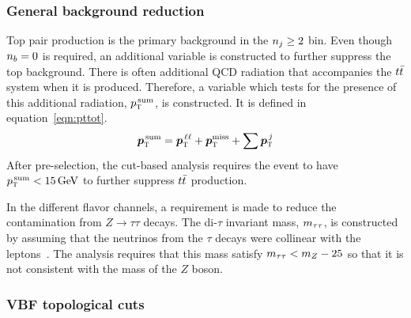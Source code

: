 \subsubsection{General background reduction}

Top pair production is the primary background in the $n_j \geq 2$ bin. Even though $n_b = 0$ is required, an additional variable is constructed to further suppress the top background. There is often additional QCD radiation that accompanies the $t\bar{t}$ system when it is produced. Therefore, a variable which tests for the presence of this additional radiation, $p_{\textrm{\footnotesize\sc t}}^{\,\rm sum}$, is constructed. It is defined in equation~\ref{eqn:pttot}.
%
\begin{equation}
\hbox{\bm{$p$}}_{\textrm{\footnotesize\sc t}}^{\,\rm sum} = \hbox{\bm{$p$}}_{\textrm{\footnotesize\sc t}}^{\,\ell\ell} + \hbox{\bm{$p$}}_{\textrm{\footnotesize\sc t}}^{\rm miss} + \sum \hbox{\bm{$p$}}_{\textrm{\footnotesize\sc t}}^{\,j}
\label{eqn:pttot}
\end{equation} 
%
After pre-selection, the cut-based analysis requires the event to have $\pTtot < 15 \GeV$ to further suppress $t\bar{t}$ production.  

In the different flavor channels, a requirement is made to reduce the contamination from $Z\to\tau\tau$ decays. The di-$\tau$ invariant mass, $m_{\tau\tau}$, is constructed by assuming that the neutrinos from the $\tau$ decays were collinear with the leptons~\cite{collinear}. The analysis requires that this mass satisfy $m_{\tau\tau} < m_Z - 25$ \GeV so that it is not consistent with the mass of the $Z$ boson. 

\subsubsection{VBF topological cuts}
\label{sec:vbf_topocuts}

